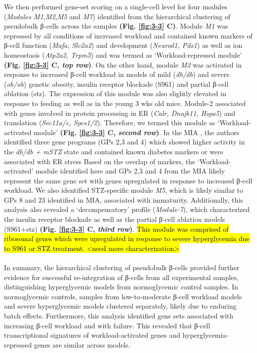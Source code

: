 We then performed gene-set scoring on a single-cell level for four modules (\textit{Modules M1,M2,M5} and \textit{M7}) identified from the hierarchical clustering of pseudobulk β-cells across the samples \textbf{(Fig. \ref{fig:3-3} C)}. Module \textit{M1} was repressed by all conditions of increased workload and contained known markers of β-cell function (\textit{Mafa, Slc2a2}) and development (\textit{Neurod1, Pdx1}) as well as ion homeostasis (\textit{Atp2a2, Trpm5}) and was termed as `Workload-repressed module' \textbf{(Fig. \ref{fig:3-3} C, \textit{top row})}. On the other hand, module \textit{M2} was activated in response to increased β-cell workload in models of mild (\textit{db/db}) and severe (\textit{ob/ob}) genetic obesity, insulin receptor blockade (S961) and partial β-cell ablation (\gls{stz}). The expression of this module was also slightly elevated in response to feeding as well as in the young 3 wks old mice. Module-2 associated with genes involved in protein processing in ER (\textit{Calr, Dnajb11, Hspa5}) and translation (\textit{Sec11a/c, Spcs1/2}). Therefore, we termed this module as ‘Workload-activated module’ \textbf{(Fig. \ref{fig:3-3} C, \textit{second row})}. In the MIA \textbf{\cite{hrovatin_delineating_2023}}, the authors identified three gene programs (GPs 2,3 and 4) which showed higher activity in the \textit{db/db + mSTZ} state and contained known diabetes markers or were associated with ER stress Based on the overlap of markers, the `Workload-activated' module identified here and GPs 2,3 and 4 from the MIA likely represent the same gene set with genes upregulated in response to increased β-cell workload. We also identified STZ-specific module \textit{M5}, which is likely similar to GPs 8 and 23 identified in MIA, associated with immaturity. Additionally, this analysis also revealed a ‘decompensatory’ profile (\textit{Module-7}), which characterized the insulin receptor blockade as well as the partial β-cell ablation models (S961+\gls{stz}) \textbf{(Fig. \ref{fig:3-3} C, \textit{third row})}. \hl{This module was comprised of ribosomal genes which were upregulated in response to severe hyperglycemia due to S961 or STZ treatment. <need more characterization>}\\\\
In summary, the hierarchical clustering of pseudobulk β-cells provided further evidence for successful re-integration of β-cells from all experimental samples, distinguishing hyperglycemic models from normoglycemic control samples. In normoglycemic controls, samples from low-to-moderate β-cell workload models and severe hyperglycemic models clustered separately, likely due to enduring batch effects. Furthermore, this analysis identified gene sets associated with increasing β-cell workload and with failure. This revealed that β-cell transcriptional signatures of workload-activated genes and hyperglycemia-repressed genes are similar across models.


